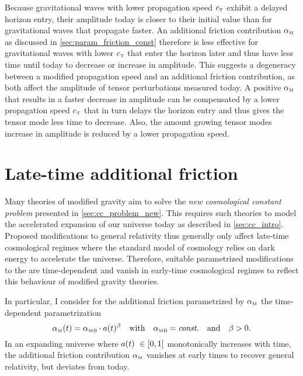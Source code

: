 \documentclass[parskip=half]{scrreprt}
\begin{document}
Because gravitational waves with lower propagation speed \({c_{\textnormal{\tiny{T}}}}\) exhibit a delayed horizon entry, their amplitude today is closer to their initial value than for gravitational waves that propagate faster. An additional friction contribution \({\alpha_{\textnormal{\tiny{M}}}}\) as discussed in \autoref{sec:param_friction_const} therefore is less effective for gravitational waves with lower \({c_{\textnormal{\tiny{T}}}}\) that enter the horizon later and thus have less time until today to decrease or increase in amplitude. This suggests a degeneracy between a modified propagation speed and an additional friction contribution, as both affect the amplitude of tensor perturbations measured today. A positive \({\alpha_{\textnormal{\tiny{M}}}}\) that results in a faster decrease in amplitude can be compensated by a lower propagation speed \({c_{\textnormal{\tiny{T}}}}\) that in turn delays the horizon entry and thus gives the tensor mode less time to decrease. Also, the amount growing tensor modes increase in amplitude is reduced by a lower propagation speed.



\section{Late-time additional friction}

Many theories of modified gravity aim to solve the \emph{new cosmological constant problem} presented in \autoref{sec:cc_problem_new}. This requires such theories to model the accelerated expansion of our universe today as described in \autoref{sec:cc_intro}. Proposed modifications to general relativity thus generally only affect late-time cosmological regimes  where the \LCDM standard model of cosmology relies on dark energy to accelerate the universe. Therefore, suitable parametrized modifications to the  are time-dependent and vanish in early-time cosmological regimes to reflect this behaviour of modified gravity theories.

In particular, I consider for the additional friction parametrized by \({\alpha_{\textnormal{\tiny{M}}}}\) the time-dependent pa\-ra\-me\-tri\-za\-tion
\begin{equation}\label{eq:friction_param_powerlaw}
	{\alpha_{\textnormal{\tiny{M}}}}(t) = {\alpha_{\textnormal{\tiny{M}}}}_0 \cdot a(t)^\beta \quad \text{with} \quad {\alpha_{\textnormal{\tiny{M}}}}_0 = \textnormal{\textit{const.}} \quad \text{and} \quad \beta > 0
	\mathpunct{.}
\end{equation}
In an expanding universe where \(a(t) \in \sbr{0,1}\) monotonically increases with time, the additional friction contribution \({\alpha_{\textnormal{\tiny{M}}}}\) vanishes at early times to recover general relativity, but deviates from \LCDM today.
\end{document}
